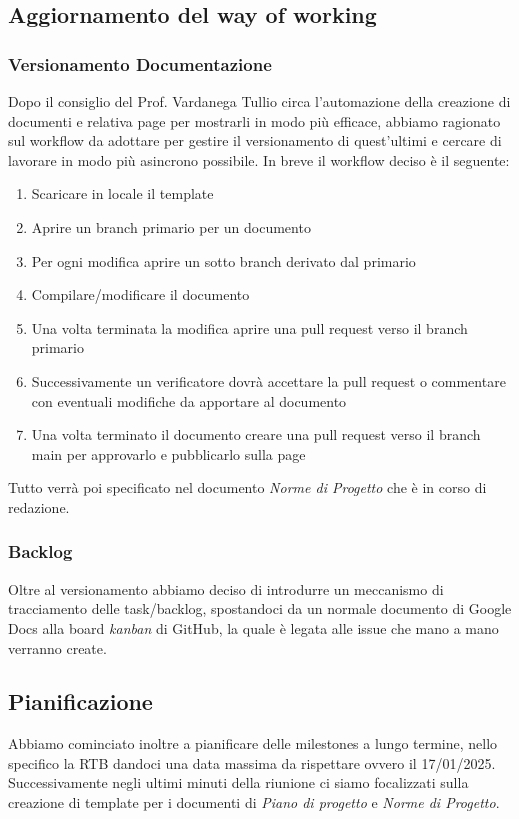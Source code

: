 \subsection{Aggiornamento del way of working}
\subsubsection{Versionamento Documentazione}
Dopo il consiglio del Prof. Vardanega Tullio circa l'automazione della creazione di documenti e relativa page per mostrarli in modo più efficace, abbiamo ragionato 
sul workflow da adottare per gestire il versionamento di quest'ultimi e cercare di lavorare in modo più asincrono possibile.
In breve il workflow deciso è il seguente:
\begin{enumerate}
    \item Scaricare in locale il template
    \item Aprire un branch primario per un documento
    \item Per ogni modifica aprire un sotto branch derivato dal primario
    \item Compilare/modificare il documento
    \item Una volta terminata la modifica aprire una pull request verso il branch primario
    \item Successivamente un verificatore dovrà accettare la pull request o commentare con eventuali modifiche da apportare al documento
    \item Una volta terminato il documento creare una pull request verso il branch main per approvarlo e pubblicarlo sulla page
\end{enumerate}
Tutto verrà poi specificato nel documento \textit{Norme di Progetto} che è in corso di redazione.
\subsubsection{Backlog}
Oltre al versionamento abbiamo deciso di introdurre un meccanismo di tracciamento delle task/backlog, spostandoci da un normale documento di Google Docs alla board \textit{kanban} di GitHub, la quale è legata
alle issue che mano a mano verranno create.

\subsection{Pianificazione}
Abbiamo cominciato inoltre a pianificare delle milestones a lungo termine, nello specifico la RTB dandoci una data massima da rispettare ovvero il 17/01/2025. Successivamente negli ultimi minuti della riunione
ci siamo focalizzati sulla creazione di template per i documenti di \textit{Piano di progetto} e \textit{Norme di Progetto}.

